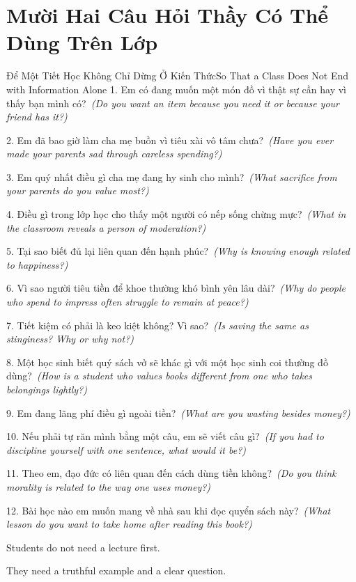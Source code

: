 \section*{Mười Hai Câu Hỏi Thầy Có Thể Dùng Trên Lớp}
\begin{truyen}{Để Một Tiết Học Không Chỉ Dừng Ở Kiến Thức}{So That a Class Does Not End with Information Alone}
1. Em có đang muốn một món đồ vì thật sự cần hay vì thấy bạn mình có?\
\textit{(Do you want an item because you need it or because your friend has it?)}

2. Em đã bao giờ làm cha mẹ buồn vì tiêu xài vô tâm chưa?\
\textit{(Have you ever made your parents sad through careless spending?)}

3. Em quý nhất điều gì cha mẹ đang hy sinh cho mình?\
\textit{(What sacrifice from your parents do you value most?)}

4. Điều gì trong lớp học cho thấy một người có nếp sống chừng mực?\
\textit{(What in the classroom reveals a person of moderation?)}

5. Tại sao biết đủ lại liên quan đến hạnh phúc?\
\textit{(Why is knowing enough related to happiness?)}

6. Vì sao người tiêu tiền để khoe thường khó bình yên lâu dài?\
\textit{(Why do people who spend to impress often struggle to remain at peace?)}

7. Tiết kiệm có phải là keo kiệt không? Vì sao?\
\textit{(Is saving the same as stinginess? Why or why not?)}

8. Một học sinh biết quý sách vở sẽ khác gì với một học sinh coi thường đồ dùng?\
\textit{(How is a student who values books different from one who takes belongings lightly?)}

9. Em đang lãng phí điều gì ngoài tiền?\
\textit{(What are you wasting besides money?)}

10. Nếu phải tự răn mình bằng một câu, em sẽ viết câu gì?\
\textit{(If you had to discipline yourself with one sentence, what would it be?)}

11. Theo em, đạo đức có liên quan đến cách dùng tiền không?\
\textit{(Do you think morality is related to the way one uses money?)}

12. Bài học nào em muốn mang về nhà sau khi đọc quyển sách này?\
\textit{(What lesson do you want to take home after reading this book?)}
\end{truyen}

\begin{ghinhoanh}
Students do not need a lecture first.

They need a truthful example and a clear question.
\end{ghinhoanh}

\ngancach